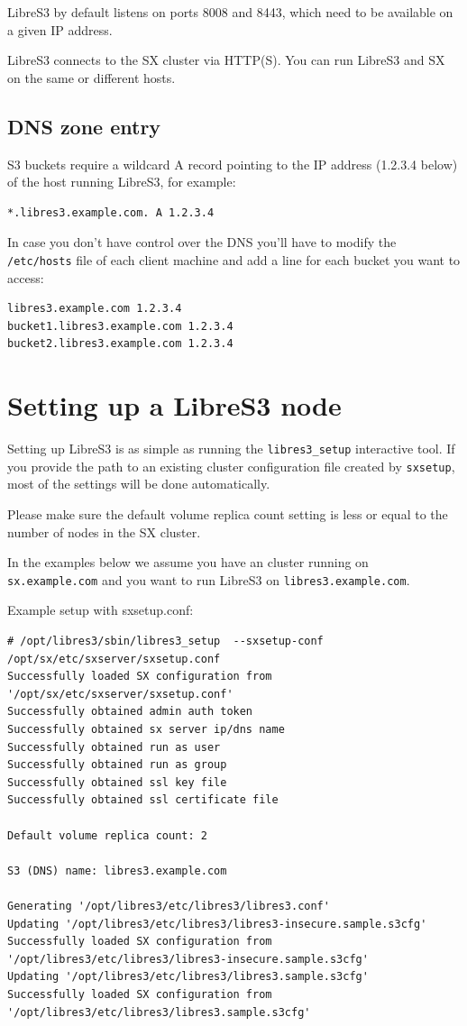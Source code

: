 LibreS3 by default listens on ports 8008 and 8443, which need to be available on a given
IP address.

LibreS3 connects to the SX cluster via HTTP(S). You can run LibreS3 and SX
on the same or different hosts.

\subsection*{DNS zone entry}

S3 buckets require a wildcard A record pointing to the IP address (1.2.3.4 below) of the
host running LibreS3, for example:
\small
\begin{lstlisting}
*.libres3.example.com. A 1.2.3.4
\end{lstlisting}
\LARGE

In case you don't have control over the DNS you'll have to modify the \verb|/etc/hosts| file
of each client machine and add a line for each bucket you want to access:
\small
\begin{lstlisting}
libres3.example.com 1.2.3.4
bucket1.libres3.example.com 1.2.3.4
bucket2.libres3.example.com 1.2.3.4
\end{lstlisting}
\LARGE

\section*{Setting up a LibreS3 node}

Setting up LibreS3 is as simple as running the \verb+libres3_setup+ interactive
tool. If you provide the path to an existing \SX cluster configuration file created
by \verb+sxsetup+, most of the settings will be done automatically.

Please make sure the default volume replica count setting is less or equal
to the number of nodes in the SX cluster.

In the examples below we assume you
have an \SX cluster running on \verb|sx.example.com| and you want to run
LibreS3 on \verb|libres3.example.com|.

Example setup with sxsetup.conf:
\small
\begin{lstlisting}
# /opt/libres3/sbin/libres3_setup  --sxsetup-conf /opt/sx/etc/sxserver/sxsetup.conf
Successfully loaded SX configuration from '/opt/sx/etc/sxserver/sxsetup.conf'
Successfully obtained admin auth token
Successfully obtained sx server ip/dns name
Successfully obtained run as user
Successfully obtained run as group
Successfully obtained ssl key file
Successfully obtained ssl certificate file

Default volume replica count: 2

S3 (DNS) name: libres3.example.com

Generating '/opt/libres3/etc/libres3/libres3.conf'
Updating '/opt/libres3/etc/libres3/libres3-insecure.sample.s3cfg'
Successfully loaded SX configuration from '/opt/libres3/etc/libres3/libres3-insecure.sample.s3cfg'
Updating '/opt/libres3/etc/libres3/libres3.sample.s3cfg'
Successfully loaded SX configuration from '/opt/libres3/etc/libres3/libres3.sample.s3cfg'
\end{lstlisting}
\LARGE

